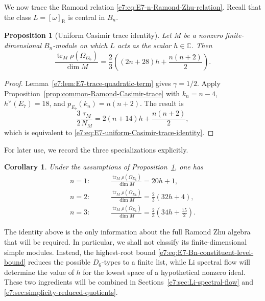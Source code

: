 \documentclass[11pt,reqno]{amsart}
\newtheorem{proposition}[theorem]{Proposition}
\newtheorem{corollary}[theorem]{Corollary}
\theoremstyle{definition}
\theoremstyle{remark}
\begin{document}
We now trace the Ramond relation
\eqref{e7:eq:E7-n-Ramond-Zhu-relation}.  Recall that the class
$L=[\omega]_{\mathrm R}$ is central in $B_n$.

\begin{proposition}[Uniform Casimir trace identity]
\label{e7:prop:E7-uniform-Casimir-trace-identity}
Let $M$ be a nonzero finite-dimensional $B_n$-module on which $L$ acts as
the scalar $h\in\mathbb C$.  Then
\begin{equation}
  \frac{\operatorname{tr}_M\rho(\Omega_{D_6})}{\dim M}
  =\frac23
   \left(
     (2n+28)h+\frac{n(n+2)}2
   \right).
  \label{e7:eq:E7-uniform-Casimir-trace-identity}
\end{equation}
\end{proposition}

\begin{proof}
Lemma~\ref{e7:lem:E7-trace-quadratic-term} gives $\gamma=1/2$.  Apply
Proposition~\ref{prop:common-Ramond-Casimir-trace} with
$k_n=n-4$, $h^\vee(E_7)=18$, and
$p_{E_7}(k_n)=n(n+2)$.  The result is
\[
 \frac32\frac{\tau_M}{N_M}
 =2(n+14)h+\frac{n(n+2)}2,
\]
which is equivalent to
\eqref{e7:eq:E7-uniform-Casimir-trace-identity}.
\end{proof}

For later use, we record the three specializations explicitly.

\begin{corollary}

Under the assumptions of
Proposition~\ref{e7:prop:E7-uniform-Casimir-trace-identity}, one has
\begin{align*}
  n=1:\qquad
  &\frac{\operatorname{tr}_M\rho(\Omega_{D_6})}{\dim M}
   =20h+1,\\
  n=2:\qquad
  &\frac{\operatorname{tr}_M\rho(\Omega_{D_6})}{\dim M}
   =\frac23(32h+4),\\
  n=3:\qquad
  &\frac{\operatorname{tr}_M\rho(\Omega_{D_6})}{\dim M}
   =\frac23\left(34h+\frac{15}{2}\right).
\end{align*}
\end{corollary}

The identity above is the only information about the full Ramond Zhu
algebra that will be required.  In particular, we shall not classify its
finite-dimensional simple modules.  Instead, the highest-root bound
\eqref{e7:eq:E7-Bn-constituent-level-bound} reduces the possible $D_6$-types
to a finite list, while Li spectral flow will determine the value of $h$
for the lowest space of a hypothetical nonzero ideal.  These two ingredients
will be combined in Sections~\ref{e7:sec:Li-spectral-flow} and
\ref{e7:sec:simplicity-reduced-quotients}.
\end{document}
